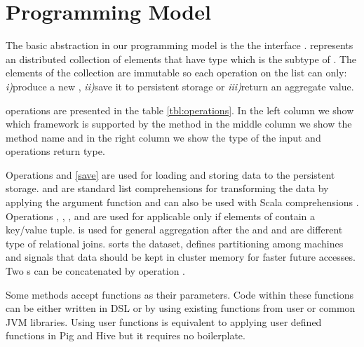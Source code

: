 \section{Programming Model}
\label{sec:programming-model}

The basic abstraction in our programming model is the the interface .  represents an distributed collection of elements that have type  which is the subtype of . The elements of the  collection are immutable so each operation on the list can only: \emph{i)}produce a new , \emph{ii)}save it to persistent storage or \emph{iii)}return an aggregate value. 

 operations are presented in the table \ref{tbl:operations}. In the left column we show which framework is supported by the method in the middle column we show the method name and in the right column we show the type of the input  and operations return type. 

Operations  and \ref{save} are used for loading and storing data to the persistent storage.  and  are standard list comprehensions for transforming the data by applying the argument function and can also be used with Scala  comprehensions . Operations , , ,  and  are used for applicable only if elements of  contain a key/value tuple.  is used for general aggregation after the  and  and  are different type of relational joins.  sorts the dataset,  defines partitioning among machines and  signals that data should be kept in cluster memory for faster future accesses. Two s can be concatenated by operation \code{++}.

Some methods accept functions as their parameters. Code within these functions can be either written in \tool DSL or by using existing functions from user or common JVM libraries. Using user functions is equivalent to applying user defined functions in Pig and Hive but it requires no boilerplate.  

